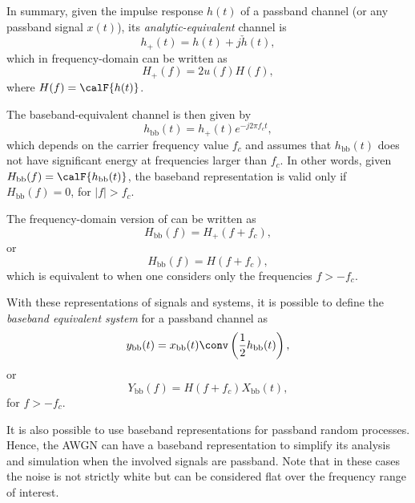 In summary, given the impulse response $h(t)$ of a passband channel (or any passband signal $x(t)$), its \emph{analytic-equivalent} channel is
\begin{equation}
h_{+}(t) = h(t) + j \check{h}(t),
\label{eq:analyticPassbandTimeDomain}
\end{equation}
which in frequency-domain can be written as
\begin{equation}
H_{+}(f) = 2 u(f) H(f),
\label{eq:analyticPassbandFrequencyDomain}
\end{equation}
where $H(f) = \calF \{ h(t) \}$.

The baseband-equivalent channel is then given by
\begin{equation}
h_{\textrm{bb}}(t) = h_{+}(t) e^{-j 2 \pi f_c t},
\label{eq:basebandEquivalentTimeDomain}
\end{equation}
which depends on the carrier frequency value $f_c$ and assumes that 
$h_{\textrm{bb}}(t)$ does not have significant energy at frequencies
larger than $f_c$. In other words, given $H_{\textrm{bb}}(f) = \calF \{ h_{\textrm{bb}}(t) \}$,
the baseband representation is valid only if $H_{\textrm{bb}}(f) = 0$, for $|f| > f_c$.

The frequency-domain version of  can be written as
\begin{equation}
H_{\textrm{bb}}(f) = H_{+}(f + f_c),
\label{eq:basebandEquivalentFreqDomain1}
\end{equation}
or
\begin{equation}
H_{\textrm{bb}}(f) = H(f + f_c),
\label{eq:eq:basebandEquivalentFreqDomain2}
\end{equation}
which is equivalent to  when one considers
only the frequencies $f > -f_c$.

With these representations of signals and systems, it is possible to define
the \emph{baseband equivalent system} for a passband channel as
\begin{equation}
y_{\textrm{bb}}(t) = x_{\textrm{bb}}(t) \conv \left( \frac{1}{2} h_{\textrm{bb}}(t) \right),
\end{equation}
or
\begin{equation}
Y_{\textrm{bb}}(f) = H(f+f_c) X_{\textrm{bb}}(t),
\end{equation}
for $f > -f_c$.

It is also possible to use baseband representations for passband random processes. Hence, the AWGN can have a baseband representation to simplify its analysis and simulation when the involved signals are passband. Note that in these cases the noise is not strictly white but can be considered flat over the frequency range of interest.

